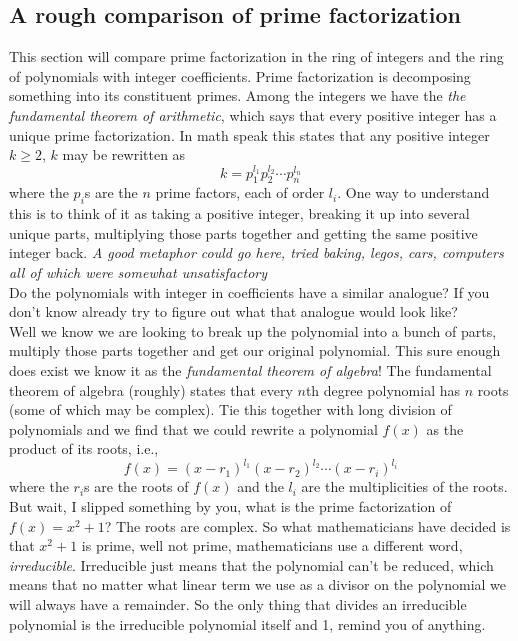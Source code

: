 \documentclass[12pt]{article}
\begin{document}
\subsection*{A rough comparison of prime factorization}
This section will compare prime factorization in the ring of integers and the ring of polynomials with integer coefficients.  Prime factorization is decomposing something into its constituent primes.  Among the integers we have the \emph{the fundamental theorem of arithmetic}, which says that every positive integer has a unique prime factorization.  In math speak this states that any positive integer $k \geq 2$, $k$ may be rewritten as 
$$k = p_1^{l_1} p_2^{l_2} \cdots p_n^{l_n}$$ 
where the $p_i$s are the $n$ prime factors, each of order $l_i$.  One way to understand this is to think of it as taking a positive integer, breaking it up into several unique parts, multiplying those parts together and getting the same positive integer back. \emph{A good metaphor could go here, tried baking, legos, cars, computers all of which were somewhat unsatisfactory}  \\

Do the polynomials with integer in coefficients have a similar analogue?  If you don't know already try to figure out what that analogue would look like?\\

Well we know we are looking to break up the polynomial into a bunch of parts, multiply those parts together and get our original polynomial.  This sure enough does exist we know it as the \emph{fundamental theorem of algebra}!  The fundamental theorem of algebra (roughly) states  that every $n$th degree polynomial has $n$ roots (some of which may be complex).  Tie this together with long division of polynomials and we find that we could rewrite a polynomial $f(x)$ as the product of its roots, i.e., 
$$ f(x) = (x-r_1)^{l_1}(x-r_2)^{l_2}\cdots(x-r_i)^{l_i}$$
where the $r_i$s are the roots of $f(x)$ and the $l_i$ are the multiplicities of the roots.\\

But wait, I slipped something by you, what is the prime factorization of $f(x)= x^2 + 1$?  The roots are complex.  So what mathematicians have decided is that $x^2 + 1$ is prime, well not prime, mathematicians use a different word, \emph{irreducible}.  Irreducible just means that the polynomial can't be reduced, which means that no matter what linear term we use as a divisor on the polynomial we will always have a remainder.  So the only thing that divides an irreducible polynomial is the irreducible polynomial itself and 1, remind you of anything.\\
\end{document}
